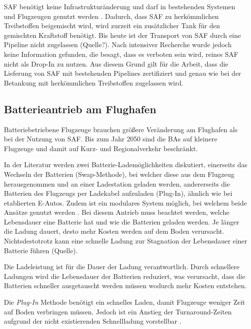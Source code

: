 SAF benötigt keine Infrastrukturänderung und darf in bestehenden Systemen 
und Flugzeugen genutzt werden \cite{dalmia2022powering}.
Dadurch, dass SAF zu herkömmlichen Treibstoffen beigemischt wird, 
wird zurzeit ein zusätzlicher Tank für den gemischten Kraftstoff benötigt. 
Bis heute ist der Transport von SAF durch eine Pipeline nicht zugelassen (Quelle?).
Nach intensiver Recherche wurde jedoch keine Information gefunden, 
die besagt, dass es verboten sein wird, reines SAF nicht als Drop-In zu nutzen.
Aus diesem Grund gilt für die Arbeit, dass die Lieferung von SAF mit bestehenden Pipelines 
zertifiziert und genau wie bei der Betankung mit herkömmlichen Treibstoffen zugelassen wird.

\subsection{Batterieantrieb am Flughafen}
Batteriebetriebene Flugzeuge brauchen größere Veränderung am 
Flughafen als bei der Nutzung von SAF.
Bis zum Jahr 2050 sind die BAs auf kleinere Flugzeuge 
und damit auf Kurz- und Regionalverkehr beschränkt. 

In der Literatur werden zwei Batterie-Lademöglichkeiten diskutiert, 
einerseits das Wechseln der Batterien (Swap-Methode), 
bei welcher diese aus dem Flugzeug herausgenommen und an einer Ladestation geladen werden, 
andererseits die Batterien des Flugzeugs per Ladekabel aufzuladen (Plug-In), 
ähnlich wie bei etablierten E-Autos.
Zudem ist ein modulares System möglich, bei welchem beide Ansätze genutzt werden \cite{salucci2020optimal}.
%
Bei diesem Antrieb muss beachtet werden, 
welche Lebensdauer eine Batterie hat und wie die Batterien geladen werden. 
Je länger die Ladung dauert, desto mehr Kosten werden auf dem Boden verursacht. 
Nichtsdestotrotz kann eine schnelle Ladung zur Stagnation der Lebensdauer einer Batterie führen (Quelle).

Die Ladeleistung ist für die Dauer der Ladung verantwortlich. 
Durch schnellere Ladungen wird die Lebensdauer der Batterien reduziert,
was verursacht, dass die Batterien schneller ausgetauscht werden 
müssen wodurch mehr Kosten entstehen.

%
Die \textit{Plug-In} Methode benötigt ein schnelles Laden, 
damit Flugzeuge weniger Zeit auf Boden verbringen müssen.
Jedoch ist ein Anstieg der Turnaround-Zeiten aufgrund der 
nicht existierenden Schnellladung vorstellbar \cite{avogadro2024demystifying}. %

